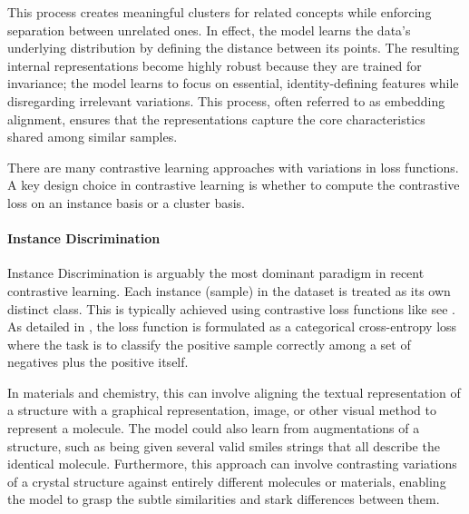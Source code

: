 This process creates meaningful clusters for related concepts while enforcing separation between unrelated ones. 
In effect, the model learns the data's underlying distribution by defining the distance between its points. 
The resulting internal representations become highly robust because they are trained for invariance; the model learns to focus on essential, identity-defining features while disregarding irrelevant variations. 
This process, often referred to as embedding alignment, ensures that the representations capture the core characteristics shared among similar samples.

There are many contrastive learning approaches with variations in loss functions. A key design choice in contrastive learning is whether to compute the contrastive loss on an instance basis or a cluster basis.


\paragraph{Instance Discrimination}
\label{sec:instance_discrimination}
Instance Discrimination is arguably the most dominant paradigm in recent contrastive learning.
Each instance (sample) in the dataset is treated as its own distinct class.  
This is typically achieved using contrastive loss functions like  see . \autocite{oord2018representation} As detailed in , the loss function is formulated as a categorical cross-entropy loss where the task is to classify the positive sample correctly among a set of negatives plus the positive itself.

In materials and chemistry, this can involve aligning the textual representation of a structure with a graphical representation, image, or other visual method to represent a molecule. 
The model could also learn from augmentations of a structure, such as being given several valid \gls{smiles} strings that all describe the identical molecule. 
Furthermore, this approach can involve contrasting variations of a crystal structure against entirely different molecules or materials, enabling the model to grasp the subtle similarities and stark differences between them.



